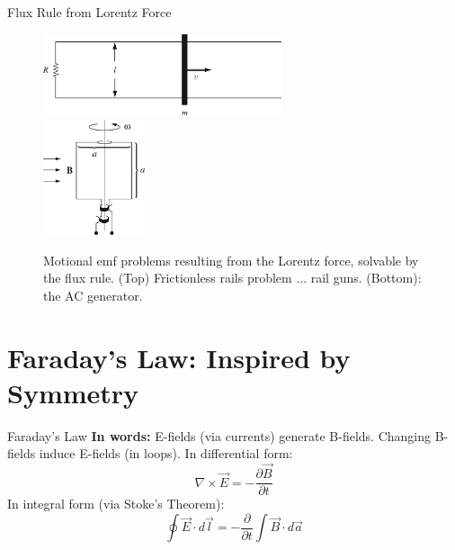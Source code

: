 \documentclass{beamer}
\begin{document}
\begin{frame}{Flux Rule from Lorentz Force}
\begin{figure}
\centering
\includegraphics[width=7cm]{figures/7_17.jpg} \\
\includegraphics[width=3.0cm]{figures/7_19.jpg}
\caption{\label{fig:gen} Motional emf problems resulting from the Lorentz force, solvable by the flux rule. (Top) Frictionless rails problem ... rail guns.  (Bottom): the AC generator.}
\end{figure}
\end{frame}

\section{Faraday's Law: Inspired by Symmetry}

\begin{frame}{Faraday's Law}
\alert{\textbf{In words:}} E-fields (via currents) generate B-fields.  Changing B-fields induce E-fields (in loops). 
In differential form:
\begin{equation}
\boxed{
\nabla \times \vec{E} = -\frac{\partial \vec{B}}{\partial t}
}
\end{equation}
In integral form (via Stoke's Theorem):
\begin{equation}
\boxed{
\oint \vec{E} \cdot d\vec{l} = - \frac{\partial}{\partial t} \int \vec{B} \cdot d\vec{a}
}
\end{equation}
\end{frame}
\end{document}
